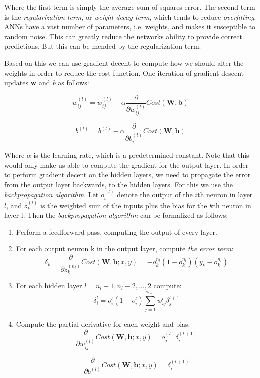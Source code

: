 Where the first term is simply the average sum-of-squares error. The second term is the \textit{regularization term}, or \textit{weight decay term}, which tends to reduce \textit{overfitting}. ANNs have a vast number of parameters, i.e. weights, and makes it susceptible to random noise. This can greatly reduce the networks ability to provide correct predictions, But this  can be mended by the regularization term. 

Based on this we can use gradient decent to compute how we should alter the weights in order to reduce the cost function. One iteration of gradient descent updates \textbf{w} and \textit{b} as follows:

\begin{equation}
	w_{ij}^{(l)} = w_{ij}^{(l)} - \alpha\frac{\partial}{\partial w_{ij}^{(l)} }Cost(\mathbf{W},\mathbf{b})
\end{equation}

\begin{equation}
	b^{(l)} = b^{(l)} - \alpha\frac{\partial}{\partial b_{i}^{(l)} }Cost(\mathbf{W},\mathbf{b})
\end{equation}

Where $ \alpha $ is the learning rate, which is a predetermined constant. Note that this would only make us able to compute the gradient for the output layer. In order to perform gradient decent on the hidden layers, we need to propagate the error from the output layer backwards, to the hidden layers. For this we use the \textit{backpropagation algorithm}. Let $ o_i^{(l)} $ denote the output of the $i$th neuron in layer $l$, and $z_k^{(l)}$ is the weighted sum of the inputs plus the bias for the $k$th neuron in layer l. Then the \textit{backpropagation algorithm} can be formalized as follows: 

\begin{enumerate}
	\item Perform a feedforward pass, computing the output of every layer.
	\item For each output neuron k in the output layer, compute \textit{the error term}: 
	\begin{equation}
		\delta_k = \frac{\partial}{\partial z_{k}^{(n_l)} }Cost(\mathbf{W,b}; x, y) = -o_k^{n_l}(1-o_k^{n_l})(y_k-o_k^{n_l})
	\end{equation} 
	\item For each hidden layer $ l = n_l - 1, n_l - 2,\dots, 2 $ compute: 
	\begin{equation}
		\delta_i^{l} = o_i^l(1-o_i^l)\sum_{j=1}^{s_{l+1}} w_{ij}^l \delta_j^{l+1} 
	\end{equation}
	\item Compute the partial derivative for each weight and bias:
	\begin{equation}
		\frac{\partial}{\partial w_{ij}^{(l)} }Cost(\mathbf{W,b}; x, y) = o_j^{(l)}\delta_i^{(l+1)}
	\end{equation}
	
	\begin{equation}
		\frac{\partial}{\partial b^{(l)} }Cost(\mathbf{W,b}; x, y) = \delta_i^{(l+1)}
	\end{equation}
\end{enumerate}
	
